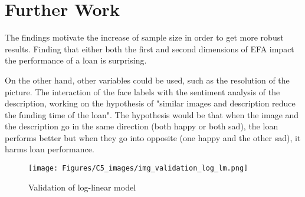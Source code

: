 \section{Further Work}
The findings motivate the increase of sample size in order to get more robust results. Finding that either both the first and second dimensions of EFA impact the performance of a loan is surprising. \par
On the other hand, other variables could be used, such as the resolution of the picture. The interaction of the face labels with the sentiment analysis of the description, working on the hypothesis of "similar images and description reduce the funding time of the loan". The hypothesis would be that when the image and the description go in the same direction (both happy or both sad), the loan performs better but when they go into opposite (one happy and the other sad), it harms loan performance.


\begin{figure}[H]
\centering
\texttt{[image: Figures/C5\_images/img\_validation\_log\_lm.png]}
\caption{Validation of log-linear model}
\label{fig:validation}
\end{figure}
